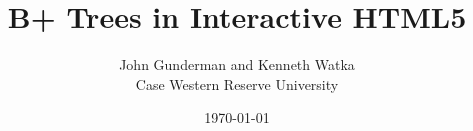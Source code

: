 \title{B+ Trees in Interactive HTML5}
\author{
  John Gunderman and Kenneth Watka \\
  Case Western Reserve University\\
}
\date{\today}

\maketitle

\begin{abstract}

\end{abstract}

\vspace{.5in}







